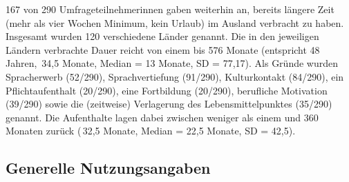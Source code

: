 
167 von 290 Umfrageteilnehmer{\textperiodcentered}innen gaben weiterhin an, bereits längere Zeit (mehr als vier Wochen Minimum, kein Urlaub) im Ausland verbracht zu haben. Insgesamt wurden 120 verschiedene Länder genannt. Die in den jeweiligen Ländern verbrachte Dauer reicht von einem bis 576 Monate (entspricht 48 Jahren, \diameter\,34,5 Monate, Median = 13 Monate, SD = 77,17). Als Gründe wurden Spracherwerb (52/290), Sprachvertiefung (91/290), Kulturkontakt (84/290), ein Pflichtaufenthalt (20/290), eine Fortbildung (20/290), berufliche Motivation (39/290) sowie die (zeitweise) Verlagerung des Lebensmittelpunktes (35/290) genannt. Die Aufenthalte lagen dabei zwischen weniger als einem und 360 Monaten zurück (\diameter\,32,5 Monate, Median = 22,5 Monate, SD = 42,5).




\subsection{Generelle Nutzungsangaben}

\label{K6:sub:Gen-Nutzungsan}


